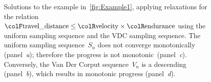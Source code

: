\begin{figure}[h]
    \centering

    \centering

    \caption{
        Solutions to the example in~\cref{fig:Example1}, applying relaxations for the relation ${\colF\text{travel\_distance}}\leq{\colR\text{velocity}}\times{\colR\text{endurance}}$ using the uniform sampling sequence and the VDC sampling sequence.
        The uniform sampling sequence~$S_{n}$ does not converge monotonically (panel~\emph{a}); therefore the progress is not monotonic~(panel\emph{~c}).
        Conversely, the Van Der Corput sequence~$V_{n}$ is a descending   (panel~\emph{b}), which results in monotonic progress (panel~\emph{d}).
    }
\end{figure}

%
%
%
%

